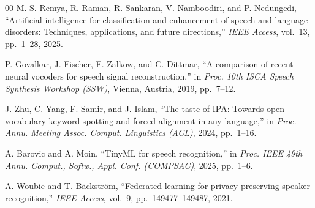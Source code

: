 \documentclass[conference]{IEEEtran}
\begin{document}
\begin{thebibliography}{00}
 M. S. Remya, R. Raman, R. Sankaran, V. Namboodiri, and P. Nedungedi, ``Artificial intelligence for classification and enhancement of speech and language disorders: Techniques, applications, and future directions,'' \textit{IEEE Access}, vol.~13, pp.~1--28, 2025.

 P. Govalkar, J. Fischer, F. Zalkow, and C. Dittmar, ``A comparison of recent neural vocoders for speech signal reconstruction,'' in \textit{Proc. 10th ISCA Speech Synthesis Workshop (SSW)}, Vienna, Austria, 2019, pp.~7--12.

 J. Zhu, C. Yang, F. Samir, and J. Islam, ``The taste of IPA: Towards open-vocabulary keyword spotting and forced alignment in any language,'' in \textit{Proc. Annu. Meeting Assoc. Comput. Linguistics (ACL)}, 2024, pp.~1--16.

 A. Barovic and A. Moin, ``TinyML for speech recognition,'' in \textit{Proc. IEEE 49th Annu. Comput., Softw., Appl. Conf. (COMPSAC)}, 2025, pp.~1--6.

 A. Woubie and T. B\"{a}ckstr\"{o}m, ``Federated learning for privacy-preserving speaker recognition,'' \textit{IEEE Access}, vol.~9, pp.~149477--149487, 2021.

\end{thebibliography}
\end{document}
